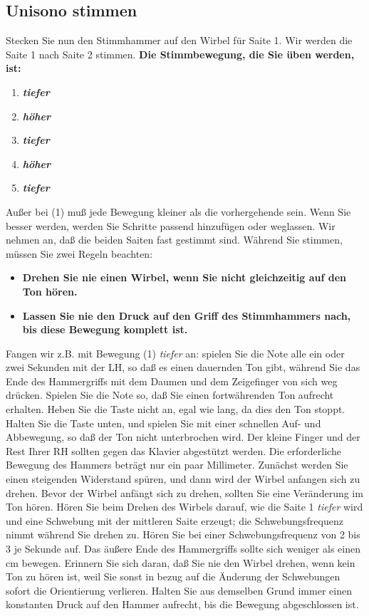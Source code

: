 \subsection{Unisono stimmen}

Stecken Sie nun den Stimmhammer auf den Wirbel für Saite 1.
 Wir werden die Saite 1 nach Saite 2 stimmen.
 \textbf{Die Stimmbewegung, die Sie üben werden, ist:}
\begin{enumerate}
	\item \textbf{\textit{tiefer}}
	\item \textbf{\textit{höher}}
	\item \textbf{\textit{tiefer}}
	\item \textbf{\textit{höher}}
	\item \textbf{\textit{tiefer}}
\end{enumerate}

Außer bei (1) muß jede Bewegung kleiner als die vorhergehende sein.
 Wenn Sie besser werden, werden Sie Schritte passend hinzufügen oder weglassen.
 Wir nehmen an, daß die beiden Saiten fast gestimmt sind.
 Während Sie stimmen, müssen Sie zwei Regeln beachten:
 
\begin{itemize}
	\item \textbf{Drehen Sie nie einen Wirbel, wenn Sie nicht gleichzeitig auf den Ton hören.}
	\item \textbf{Lassen Sie nie den Druck auf den Griff des Stimmhammers nach, bis diese Bewegung komplett ist.}
\end{itemize}

Fangen wir z.B. mit Bewegung (1) \textit{tiefer} an: spielen Sie die Note alle ein oder zwei Sekunden mit der LH, so daß es einen dauernden Ton gibt, während Sie das Ende des Hammergriffs mit dem Daumen und dem Zeigefinger von sich weg drücken.
 Spielen Sie die Note so, daß Sie einen fortwährenden Ton aufrecht erhalten.
 Heben Sie die Taste nicht an, egal wie lang, da dies den Ton stoppt.
 Halten Sie die Taste unten, und spielen Sie mit einer schnellen Auf- und Abbewegung, so daß der Ton nicht unterbrochen wird.
 Der kleine Finger und der Rest Ihrer RH sollten gegen das Klavier abgestützt werden.
 Die erforderliche Bewegung des Hammers beträgt nur ein paar Millimeter.
 Zunächst werden Sie einen steigenden Widerstand spüren, und dann wird der Wirbel anfangen sich zu drehen.
 Bevor der Wirbel anfängt sich zu drehen, sollten Sie eine Veränderung im Ton hören.
 Hören Sie beim Drehen des Wirbels darauf, wie die Saite 1 \textit{tiefer} wird und eine Schwebung mit der mittleren Saite erzeugt; die Schwebungsfrequenz nimmt während Sie drehen zu.
 Hören Sie bei einer Schwebungsfrequenz von 2 bis 3 je Sekunde auf.
 Das äußere Ende des Hammergriffs sollte sich weniger als einen cm bewegen.
 Erinnern Sie sich daran, daß Sie nie den Wirbel drehen, wenn kein Ton zu hören ist, weil Sie sonst in bezug auf die Änderung der Schwebungen sofort die Orientierung verlieren.
 Halten Sie aus demselben Grund immer einen konstanten Druck auf den Hammer aufrecht, bis die Bewegung abgeschlossen ist.
 

